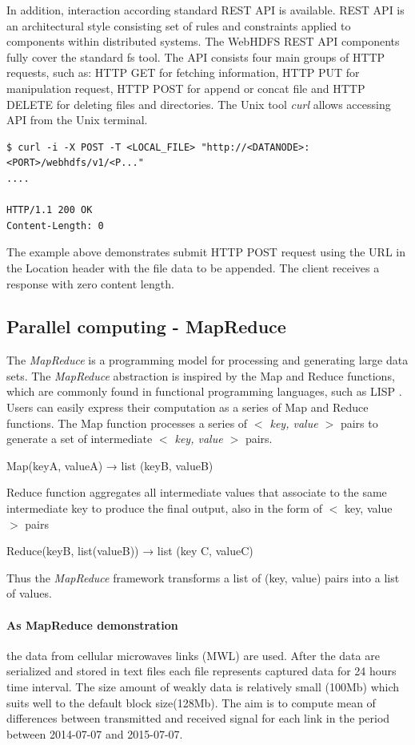 \documentclass[a4paper,12pt,oneside]{report}
\begin{document}
	In addition, interaction according standard REST API is available. REST API is
	an architectural style consisting set of rules and constraints applied to
	components within distributed systems. The WebHDFS REST API components fully
	cover the standard fs tool. The API consists four main groups of HTTP requests,
	such as: HTTP GET for fetching information, HTTP PUT for manipulation request,
	HTTP POST for append or concat file and HTTP DELETE for deleting files and
	directories.\cite{rest_api}
	The Unix tool \textit{curl}  allows accessing API from the Unix terminal. 
	\begin{footnotesize}
		\begin{lstlisting}[style=mybash]
$ curl -i -X POST -T <LOCAL_FILE> "http://<DATANODE>:<PORT>/webhdfs/v1/<P..."
....

HTTP/1.1 200 OK
Content-Length: 0
		\end{lstlisting}
	\end{footnotesize}
	The example above demonstrates submit  HTTP POST request using the URL in the
	Location header with the file data to be appended. The client receives a
	response with zero content length.
	
	
	\subsection{Parallel computing - MapReduce}		
	The \emph{MapReduce} is a programming model for processing and generating large
	data
	sets. The \emph{MapReduce} abstraction is inspired by the Map and Reduce
	functions, which are commonly
	found in functional programming languages, such as LISP \cite{lisp}. Users can
	easily express their
	computation as a series of Map and Reduce functions. The Map function processes
	a series of
	\textit{$<$ key, value $>$} pairs to generate a set of intermediate \textit{$<$
		key, value $>$} pairs.
	\begin{center}
		Map(keyA, valueA) → list (keyB, valueB)
	\end{center}
	Reduce function aggregates all intermediate values that associate to the same
	intermediate key
	to produce the final output, also in the form of $<$ key, value $>$ pairs
	\begin{center}
		Reduce(keyB, list(valueB)) → list (key C, valueC)
	\end{center}
	Thus the \emph{MapReduce} framework transforms a list of (key, value) pairs into
	a list of values. 
	
	
	\paragraph{As MapReduce demonstration} the data from cellular microwaves
	links (MWL) are used.
	After  the data are  serialized and stored in text files each file
	represents captured data for 24 hours time interval. 
	The size amount of weakly data is relatively small (100Mb)
	which suits well to the default block size(128Mb).
	The aim is to compute  mean of differences between transmitted and received
	signal for each link in the period between 2014-07-07 and 2015-07-07.
	
\end{document}
